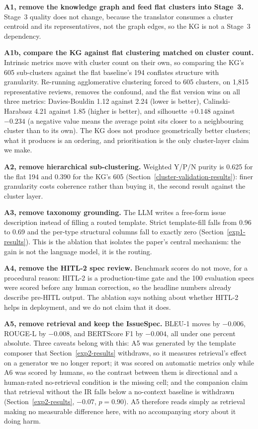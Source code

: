 \documentclass[preprint,12pt]{elsarticle}
\begin{document}
  \textbf{A1, remove the knowledge graph and feed flat clusters into Stage~3.} Stage~3 quality
  does not change, because the translator consumes a cluster centroid and its representatives, not
  the graph edges, so the KG is not a Stage~3 dependency.

  \textbf{A1b, compare the KG against flat clustering matched on cluster count.} Intrinsic metrics
  move with cluster count on their own, so comparing the KG's 605 sub-clusters against the flat
  baseline's 194 conflates structure with granularity. Re-running agglomerative clustering forced
  to 605 clusters, on 1{,}815 representative reviews, removes the confound, and the flat version
  wins on all three metrics:
  Davies-Bouldin 1.12 against 2.24 (lower is better), Calinski-Harabasz 4.21 against 1.85 (higher
  is better), and silhouette $+0.148$ against $-0.234$ (a negative value means the average point
  sits closer to a neighbouring cluster than to its own). The KG does not produce geometrically
  better clusters; what it produces is an ordering, and prioritisation is the only cluster-layer
  claim we make.

  \textbf{A2, remove hierarchical sub-clustering.} Weighted Y/P/N purity is 0.625 for the flat
  194 and 0.390 for the KG's 605 (Section~\ref{cluster-validation-results}): finer granularity
  costs coherence rather than buying it, the second result against the cluster layer.

  \textbf{A3, remove taxonomy grounding.} The LLM writes a free-form issue description instead of
  filling a routed template. Strict template-fill falls from 0.96 to 0.69 and the per-type
  structural columns fall to exactly zero (Section~\ref{exp1-results}). This is the ablation that
  isolates the paper's central mechanism: the gain is not the language model, it is the routing.

  \textbf{A4, remove the HITL-2 spec review.} Benchmark scores do not move, for a procedural
  reason: HITL-2 is a production-time gate and the 100 evaluation specs were scored before any
  human correction, so the headline numbers already describe pre-HITL output. The ablation says
  nothing about whether HITL-2 helps in deployment, and we do not claim that it does.

  \textbf{A5, remove retrieval and keep the IssueSpec.} BLEU-1 moves by $-0.006$, ROUGE-L by
  $-0.008$, and BERTScore F1 by $-0.004$, all under one percent absolute. Three caveats belong
  with this: A5 was generated by the template composer that Section~\ref{exp2-results} withdraws,
  so it measures retrieval's effect on a generator we no longer report; it was scored on automatic
  metrics only while A6 was scored by humans, so the contrast between them is directional and a
  human-rated no-retrieval condition is the missing cell; and the companion claim that retrieval
  without the IR falls below a no-context baseline is withdrawn (Section~\ref{exp2-results},
  $-0.07$, $p = 0.90$). A5 therefore reads simply as retrieval making no measurable difference
  here, with no accompanying story about it doing harm.
\end{document}

